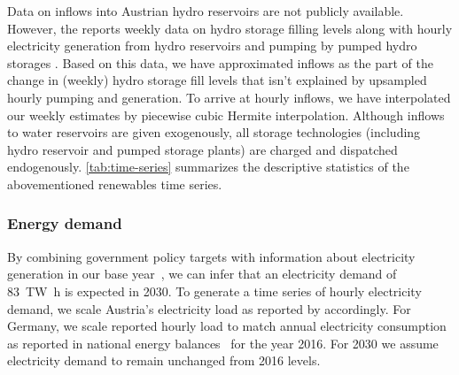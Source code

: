 \documentclass[review, 3p, times, 12pt, authoryear]{elsarticle}
\begin{document}
    Data on inflows into Austrian hydro reservoirs are not publicly available.
    However, the \cite{ENTSOE2020a} reports weekly data on hydro storage filling levels along with hourly electricity generation from hydro reservoirs and pumping by pumped hydro storages .
    Based on this data, we have approximated inflows as the part of the change in (weekly) hydro storage fill levels that isn't explained by upsampled hourly pumping and generation.
    To arrive at hourly inflows, we have interpolated our weekly estimates by piecewise cubic Hermite interpolation.
    Although inflows to water reservoirs are given exogenously, all storage technologies (including hydro reservoir and pumped storage plants) are charged and dispatched endogenously.
    \autoref{tab:time-series} summarizes the descriptive statistics of the abovementioned renewables time series.

    \subsubsection{Energy demand} \label{subsec:energy-demand}
    By combining government policy targets with information about electricity generation in our base year~\citep{StatistikAustria2020}, we can infer that an electricity demand of \SI{83}{\tera\watt\hour} is expected in 2030.
    To generate a time series of hourly electricity demand, we scale Austria's electricity load as reported by \cite{opsd2019} accordingly.
    For Germany, we scale reported hourly load to match annual electricity consumption as reported in national energy balances~ for the year 2016.
    For 2030 we assume electricity demand to remain unchanged from 2016 levels.
\end{document}

